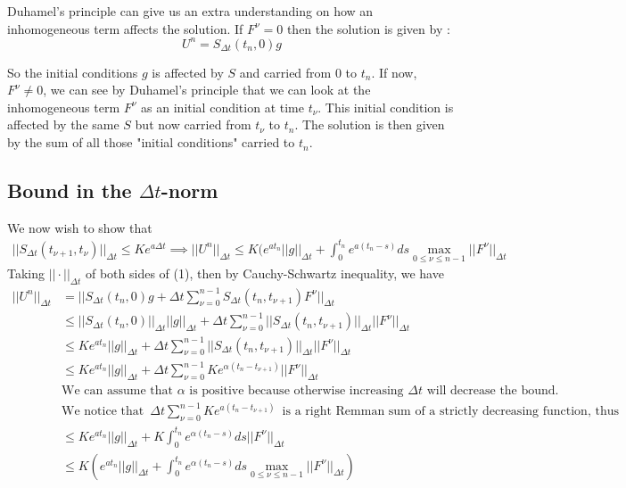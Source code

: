 Duhamel's principle can give us an extra understanding on how an inhomogeneous term affects the solution. If $F^\nu = 0$ then the solution is given by :
$$U^n = S_{\Delta t}(t_n,0)g$$

So the initial conditions $g$ is affected by $S$ and carried from $0$ to $t_n$. If now, $F^\nu \neq 0$, we can see by Duhamel's principle that we can look at the inhomogeneous term $F^\nu$ as an initial condition at time $t_\nu$. This initial condition is affected by the same $S$ but now carried from $t_\nu$ to $t_n$. The solution is then given by the sum of all those "initial conditions" carried to $t_n$.


\subsection{Bound in the $\Delta t$-norm}
We now wish to show that 
\begin{align*} 
||S_{\Delta t}(t_{\nu+1},t_{\nu})||_{\Delta t} \leq Ke^{a \Delta t} \implies ||U^n||_{\Delta t} \leq K(e^{at_n} ||g||_{\Delta t} + \int_0^{t_n} e^{a(t_n-s)} ds \max_{0\leq \nu \leq n-1} ||F^{\nu}||_{\Delta t}
\end{align*}
Taking $||\cdot ||_{\Delta t}$ of both sides of (1), then by Cauchy-Schwartz inequality, we have
\begin{align*}
||U^n||_{ \Delta t} &= ||S_{\Delta t}(t_n,0)g+\Delta t \sum_{\nu = 0}^{n-1} S_{\Delta t}(t_n , t_{\nu + 1}) F^{\nu} ||_{\Delta t} \\
&\leq ||S_{\Delta t}(t_n,0)||_{\Delta t}||g||_{\Delta t}+\Delta t \sum_{\nu = 0}^{n-1} ||S_{\Delta t}(t_n , t_{\nu + 1})||_{\Delta t} || F^{\nu} ||_{\Delta t} \\
&\leq Ke^{at_n}||g||_{\Delta t}+\Delta t \sum_{\nu = 0}^{n-1} ||S_{\Delta t}(t_n , t_{\nu + 1})||_{\Delta t} || F^{\nu} ||_{\Delta t}\\
&\leq Ke^{at_n}||g||_{\Delta t}+\Delta t \sum_{\nu = 0}^{n-1} Ke^{\alpha(t_n - t_{\nu+1})} || F^{\nu} ||_{\Delta t}\\ 
&\text{We can assume that $\alpha$ is positive because otherwise increasing $\Delta t$ will decrease the bound.}\\
&\text{We notice that} \enspace  \Delta t \sum_{\nu = 0}^{n-1} Ke^{a(t_n - t_{\nu+1})} \enspace \text{is a right Remman sum of a strictly decreasing function, thus} \\
&\leq Ke^{at_n}||g||_{\Delta t}+ K\int_0^{t_n} e^{\alpha(t_n - s)} ds || F^{\nu} ||_{\Delta t}\\ 
&\leq K(e^{at_n}||g||_{\Delta t}+ \int_0^{t_n} e^{\alpha(t_n - s)} ds \max_{0\leq \nu \leq n-1} ||F^{\nu}||_{\Delta t})
\end{align*}
